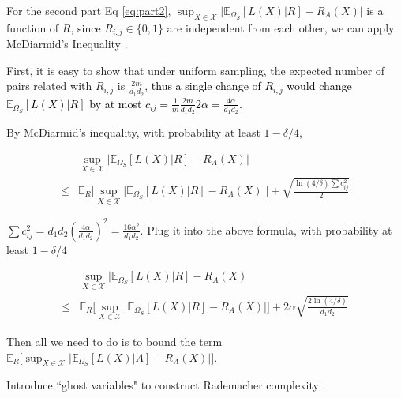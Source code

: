 \documentclass[conference]{IEEEtran}
\numberwithin{equation}{section}
\newcommand{\laks}[1]{\textcolor{black}{#1}}
\newcommand{\supX}{\sup_{X \in \mathcal{X}}}
\newcommand{\E}{\mathbb{E}}
\newtheorem{sampling strategy}{Sampling Strategy}
\begin{document}
For the second part Eq \ref{eq:part2}, $\supX \big|\mathbb{E}_{\Omega_S} [L(X) | R] - R_A(X) \big|$ is a function of $R$, since $R_{i,j} \in \{0, 1\}$ are independent from each other, we can apply McDiarmid's Inequality \cite{Mc}.

First, it is easy to show that under uniform sampling, the expected number of pairs related with $R_{i,j}$ is $\frac{2m}{d_1 d_2}$, \laks{thus a single change of $R_{i,j}$ would  change $\E_{\Omega_S}[L(X)|R] $ by at most $c_{ij} = \frac{1}{m} \frac{2m}{d_1 d_2} 2\alpha = \frac{4 \alpha }{d_1 d_2} $.} 

By McDiarmid's inequality, with probability at least $1 - \delta/4$,

\begin{equation}
    \begin{aligned}
    & \sup_{X \in \mathcal{X}} \big| \mathbb{E}_{\Omega_S} [L(X) | R] - R_A(X) \big| \\
    \leq & \mathbb{E}_R \Big[ \sup_{X \in \mathcal{X}} \big|\mathbb{E}_{\Omega_S} [L(X) | R] - R_A(X) \big| \Big] + \sqrt{ \frac{\ln(4/\delta) \sum c_{ij}^2 }{2} } \nonumber
    \end{aligned}
\end{equation}

$\sum c_{ij}^2 = d_1 d_2 (\frac{4\alpha}{d_1 d_2})^2 = \frac{16 \alpha^2}{d_1 d_2}$. Plug it into the above formula, with probability at least $1 - \delta/4$

\begin{equation}
    \begin{aligned}
    & \sup_{X \in \mathcal{X}} \big| \mathbb{E}_{\Omega_S} [L(X) | R] - R_A(X) \big| \\
    \leq & \mathbb{E}_R \Big[ \sup_{X \in \mathcal{X}} \big|\mathbb{E}_{\Omega_S} [L(X) | R] - R_A(X) \big| \Big]  + 2\alpha \sqrt{ \frac{2\ln(4/\delta) }{d_1 d_2} }  \label{eq:res_part2}
    \end{aligned}
\end{equation}

Then all we need to do is to bound the term $\mathbb{E}_R \Big[ \sup_{X \in \mathcal{X}} \big|\mathbb{E}_{\Omega_S} [L(X) | A] - R_A(X) \big| \Big]$.

Introduce ``ghost variables" to construct Rademacher complexity \cite{uml}.
\end{document}
